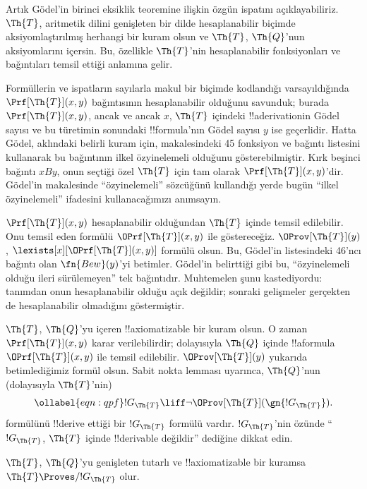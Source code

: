 \documentclass[../../../include/open-logic-section]{subfiles}
\begin{document}


Artık G\"odel'in birinci eksiklik teoremine ilişkin özgün ispatını
açıklayabiliriz. $\Th{T}$, aritmetik dilini genişleten bir dilde hesaplanabilir
biçimde aksiyomlaştırılmış herhangi bir kuram olsun ve $\Th{T}$,
$\Th{Q}$'nun aksiyomlarını içersin. Bu, özellikle $\Th{T}$'nin hesaplanabilir
fonksiyonları ve bağıntıları temsil ettiği anlamına gelir.

Formüllerin ve ispatların sayılarla makul bir biçimde kodlandığı
varsayıldığında $\Prf[\Th{T}](x,y)$ bağıntısının hesaplanabilir olduğunu
savunduk; burada $\Prf[\Th{T}](x,y)$, ancak ve ancak $x$, $\Th{T}$ içindeki
!!a{derivation}{}in G\"odel sayısı ve bu türetimin sonundaki !!{formula}'nın
G\"odel sayısı $y$ ise geçerlidir. Hatta G\"odel, aklındaki belirli kuram için, makalesindeki 45
fonksiyon ve bağıntı listesini kullanarak bu bağıntının ilkel özyinelemeli
olduğunu gösterebilmiştir. Kırk beşinci bağıntı $x B y$, onun seçtiği özel
$\Th{T}$ için tam olarak $\Prf[\Th{T}](x,y)$'dir. G\"odel'in makalesinde
``özyinelemeli'' sözcüğünü kullandığı yerde bugün ``ilkel özyinelemeli''
ifadesini kullanacağımızı anımsayın.

$\Prf[\Th{T}](x,y)$ hesaplanabilir olduğundan $\Th{T}$ içinde temsil
edilebilir. Onu temsil eden formülü $\OPrf[\Th{T}](x,y)$ ile göstereceğiz.
$\OProv[\Th{T}](y)$,
$\lexists[x][\OPrf[\Th{T}](x,y)]$ formülü olsun. Bu, G\"odel'in listesindeki
46'ncı bağıntı olan $\fn{Bew}(y)$'yi betimler. G\"odel'in belirttiği gibi bu,
``özyinelemeli olduğu ileri sürülemeyen'' tek bağıntıdır. Muhtemelen şunu
kastediyordu: tanımdan onun hesaplanabilir olduğu açık değildir; sonraki
gelişmeler gerçekten de hesaplanabilir olmadığını göstermiştir.

$\Th{T}$, $\Th{Q}$'yu içeren !!{axiomatizable} bir kuram olsun. O zaman
$\Prf[\Th{T}](x,y)$ karar verilebilirdir; dolayısıyla $\Th{Q}$ içinde
!!a{formula}~$\OPrf[\Th{T}](x,y)$ ile temsil edilebilir. $\OProv[\Th{T}](y)$
yukarıda betimlediğimiz formül olsun. Sabit nokta lemması uyarınca,
$\Th{Q}$'nun (dolayısıyla $\Th{T}$'nin)
\begin{equation}
\ollabel{eqn:qpf}
!G_\Th{T} \liff \lnot \OProv[\Th{T}](\gn{!G_\Th{T}}).
\end{equation}
formülünü !!{derive} ettiği bir $!G_\Th{T}$ formülü vardır. $!G_\Th{T}$'nin
özünde ``$!G_\Th{T}$, $\Th{T}$ içinde !!{derivable} değildir'' dediğine
dikkat edin.

\begin{lem}
$\Th{T}$, $\Th{Q}$'yu genişleten tutarlı ve !!{axiomatizable} bir kuramsa
$\Th{T} \Proves/ !G_\Th{T}$ olur.
\end{lem}
\end{document}
